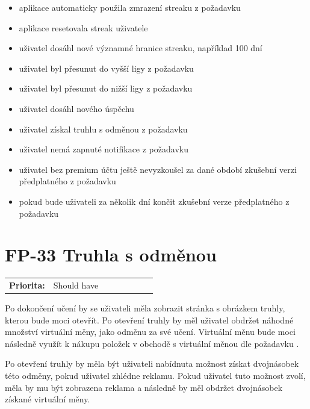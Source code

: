\begin{itemize}
    \item aplikace automaticky použila zmrazení streaku z požadavku 
    \item aplikace resetovala streak uživatele
    \item uživatel dosáhl nové významné hranice streaku, například 100 dní
    \item uživatel byl přesunut do vyšší ligy z požadavku 
    \item uživatel byl přesunut do nižší ligy z požadavku 
    \item uživatel dosáhl nového úspěchu
    \item uživatel získal truhlu s odměnou z požadavku 
    \item uživatel nemá zapnuté notifikace z požadavku 
    \item uživatel bez premium účtu ještě nevyzkoušel za dané období zkušební verzi předplatného z požadavku 
    \item pokud bude uživateli za několik dní končit zkušební verze předplatného z požadavku 
\end{itemize}

\section{FP-33 Truhla s odměnou}\label{sec:fp-treasure-chest}

\begin{tabular}{lp{0.7\linewidth}}
    \textbf{Priorita:} & Should have \\
\end{tabular}

Po dokončení učení by se uživateli měla zobrazit stránka s obrázkem truhly, kterou bude moci otevřít. Po otevření truhly by měl uživatel obdržet náhodné množství virtuální měny, jako odměnu za své učení. Virtuální měnu bude moci následně využít k nákupu položek v obchodě s virtuální měnou dle požadavku .

Po otevření truhly by měla být uživateli nabídnuta možnost získat dvojnásobek této odměny, pokud uživatel zhlédne reklamu. Pokud uživatel tuto možnost zvolí, měla by mu být zobrazena reklama a následně by měl obdržet dvojnásobek získané virtuální měny.

